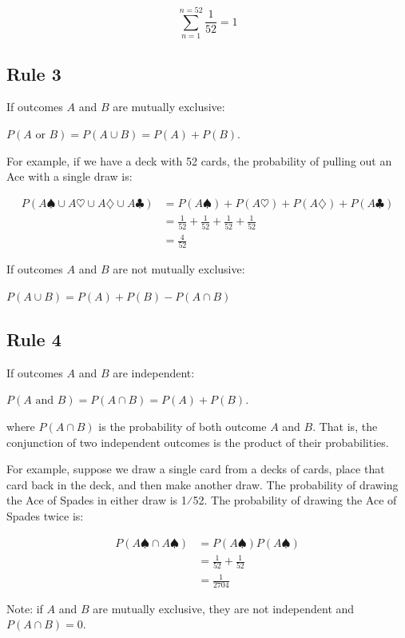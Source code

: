 \documentclass[
  letterpaper,
  DIV=11,
  numbers=noendperiod]{scrreprt}
\begin{document}
\[
\sum_{n=1}^{n=52}\frac{1}{52}=1
\]

\hypertarget{rule-3}{%
\subsection{Rule 3}\label{rule-3}}

If outcomes \(A\) and \(B\) are mutually exclusive:

\(P(A \text{ or } B)=P(A \cup B)=P(A)+P(B)\).

For example, if we have a deck with 52 cards, the probability of pulling
out an Ace with a single draw is:

\begin{align*}
P(A\spadesuit \cup A\heartsuit \cup A\diamondsuit \cup A\clubsuit)&=P(A\spadesuit)+P(A\heartsuit)+P(A\diamondsuit)+P(A\clubsuit) \\
&=\frac{1}{52}+\frac{1}{52}+\frac{1}{52}+\frac{1}{52} \\
&=\frac{4}{52}
\end{align*}

If outcomes \(A\) and \(B\) are not mutually exclusive:

\(P(A \cup B)=P(A)+P(B)-P(A\cap B)\)

\hypertarget{rule-4}{%
\subsection{Rule 4}\label{rule-4}}

If outcomes \(A\) and \(B\) are independent:

\(P(A \text{ and } B)=P(A \cap B)=P(A)+P(B)\).

where \(P(A \cap B)\) is the probability of both outcome \(A\) and
\(B\). That is, the conjunction of two independent outcomes is the
product of their probabilities.

For example, suppose we draw a single card from a decks of cards, place
that card back in the deck, and then make another draw. The probability
of drawing the Ace of Spades in either draw is 1⁄52. The probability of
drawing the Ace of Spades twice is:

\begin{align*}
P(A\spadesuit \cap A\spadesuit)&=P(A\spadesuit)P(A\spadesuit) \\
&=\frac{1}{52}+\frac{1}{52} \\
&=\frac{1}{2704}
\end{align*}

Note: if \(A\) and \(B\) are mutually exclusive, they are not
independent and \(P(A \cap B)=0\).
\end{document}
